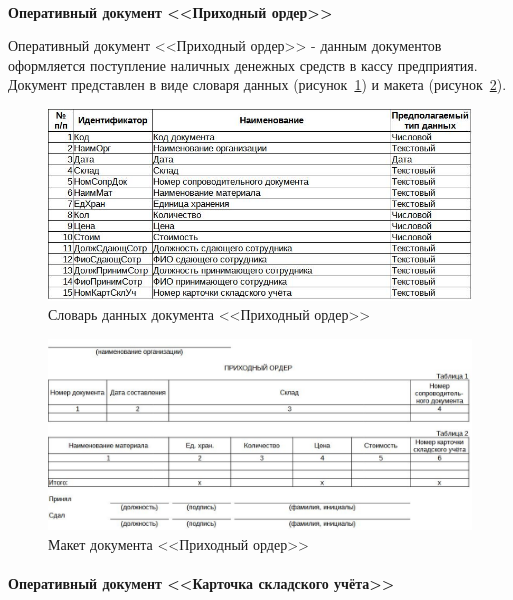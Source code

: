 \documentclass[12pt, a4paper, simple]{eskdtext}
\begin{document}
    \newpage
    \paragraph{} \textbf{Оперативный документ <<Приходный ордер>>}

    Оперативный документ <<Приходный ордер>> - данным документов оформляется
    поступление наличных денежных средств в кассу предприятия.
    Документ представлен в виде словаря данных (рисунок~\ref{fig:OP_PrihOrd_tipi})
    и макета (рисунок~\ref{fig:OP_PrihOrd_maket}).

    \begin{figure}[!h]
        \centering
        \includegraphics[width=14cm]
            {_docs/ОП_ПрихОрд_типы.jpg}
        \caption{Словарь данных документа <<Приходный ордер>>}
        \label{fig:OP_PrihOrd_tipi}
    \end{figure}

    \begin{figure}[!h]
        \centering
        \includegraphics[width=14cm]
            {_docs/ОП_ПрихОрд_макет.jpg}
        \caption{Макет документа <<Приходный ордер>>}
        \label{fig:OP_PrihOrd_maket}
    \end{figure}

    \newpage
    \paragraph{} \textbf{Оперативный документ <<Карточка складского учёта>>}
\end{document}

